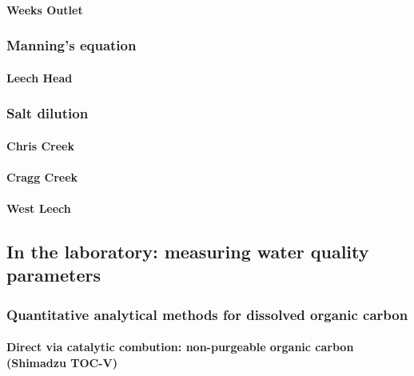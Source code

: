 \documentclass[]{article}
\let\oldparagraph\paragraph
\renewcommand{\paragraph}[1]{\oldparagraph{#1}\mbox{}}
\begin{document}
\paragraph{Weeks Outlet}\label{weeks-outlet-1}

\subsubsection{Manning's equation}\label{mannings-equation}

\paragraph{Leech Head}\label{leech-head-1}

\subsubsection{Salt dilution}\label{salt-dilution}

\paragraph{Chris Creek}\label{chris-creek-1}

\paragraph{Cragg Creek}\label{cragg-creek-1}

\paragraph{West Leech}\label{west-leech-1}

\subsection{In the laboratory: measuring water quality
parameters}\label{in-the-laboratory-measuring-water-quality-parameters}

\subsubsection{Quantitative analytical methods for dissolved organic
carbon}\label{quantitative-analytical-methods-for-dissolved-organic-carbon}

\paragraph{Direct via catalytic combution: non-purgeable organic carbon
(Shimadzu
TOC-V)}\label{direct-via-catalytic-combution-non-purgeable-organic-carbon-shimadzu-toc-v}
\end{document}
